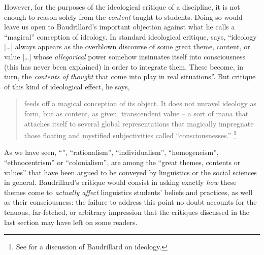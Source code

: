 \documentclass[output=paper]{langscibook}
\begin{document}
However, for the purposes of the ideological critique of a discipline, it is not enough to reason solely from the \emph{content} taught to students. Doing so would leave us open to Baudrillard's important objection against what he calls a ``magical'' conception of ideology. In standard ideological critique, \citet[79, italics original]{Baudrillard19881972} says, ``ideology […] always appears as the overblown discourse of some great theme, content, or value […] whose \emph{allegorical} power somehow insinuates itself into consciousness (this has never been explained) in order to integrate them. These become, in turn, the \emph{contents of thought} that come into play in real situations''. But critique of this kind of ideological effect, he says,

\begin{quotation}
feeds off a magical conception of its object. It does not unravel ideology as form, but as content, as given, transcendent value -- a sort of mana that attaches itself to several global representations that magically impregnate those floating and mystified subjectivities called ``consciousnesses.'' \citep[79]{Baudrillard19881972}\footnote{See \citet{Larrain1994} for a discussion of Baudrillard on ideology.} 
\end{quotation}

\noindent As we have seen, ``'', ``rationalism'', ``individualism'', ``homogeneism'', ``ethnocentrism'' or ``colonialism'', are among the ``great themes, contents or values'' that have been argued to be conveyed by linguistics or the social sciences in general. Baudrillard's critique would consist in asking exactly \emph{how} these themes come to \emph{actually affect} linguistics students' beliefs and practices, as well as their consciousness: the failure to address this point no doubt accounts for the tenuous, far-fetched, or arbitrary impression that the critiques discussed in the last section may have left on some readers. 
\end{document}
